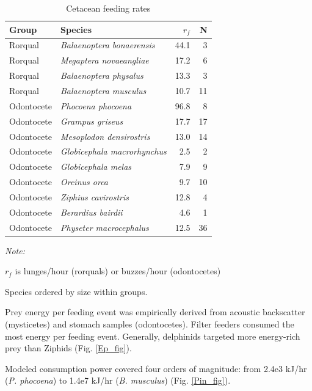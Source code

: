 \documentclass[]{elsarticle} %
\begin{document}
\begin{table}[t]

\caption{\label{tab:rf_tbl}Cetacean feeding rates \label{rf_tbl}}
\centering
\begin{threeparttable}
\begin{tabular}{llrr}
\toprule
Group & Species & $r_f$ & N\\
\midrule
Rorqual & \textit{Balaenoptera bonaerensis} & 44.1 & 3\\
Rorqual & \textit{Megaptera novaeangliae} & 17.2 & 6\\
Rorqual & \textit{Balaenoptera physalus} & 13.3 & 3\\
Rorqual & \textit{Balaenoptera musculus} & 10.7 & 11\\
Odontocete & \textit{Phocoena phocoena} & 96.8 & 8\\
Odontocete & \textit{Grampus griseus} & 17.7 & 17\\
Odontocete & \textit{Mesoplodon densirostris} & 13.0 & 14\\
Odontocete & \textit{Globicephala macrorhynchus} & 2.5 & 2\\
Odontocete & \textit{Globicephala melas} & 7.9 & 9\\
Odontocete & \textit{Orcinus orca} & 9.7 & 10\\
Odontocete & \textit{Ziphius cavirostris} & 12.8 & 4\\
Odontocete & \textit{Berardius bairdii} & 4.6 & 1\\
Odontocete & \textit{Physeter macrocephalus} & 12.5 & 36\\
\bottomrule
\end{tabular}
\begin{tablenotes}
\item \textit{Note: } 
\item $r_f$ is lunges/hour (rorquals) or buzzes/hour (odontocetes)
\item Species ordered by size within groups.
\end{tablenotes}
\end{threeparttable}
\end{table}

Prey energy per feeding event was empirically derived from acoustic
backscatter (mysticetes) and stomach samples (odontocetes). Filter
feeders consumed the most energy per feeding event. Generally,
delphinids targeted more energy-rich prey than Ziphids (Fig.
\ref{Ep_fig}).

Modeled consumption power covered four orders of magnitude: from 2.4e3
kJ/hr (\emph{P. phocoena}) to 1.4e7 kJ/hr (\emph{B. musculus}) (Fig.
\ref{Pin_fig}).
\end{document}
